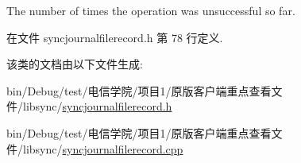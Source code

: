 The number of times the operation was unsuccessful so far. 



在文件 syncjournalfilerecord.\+h 第 78 行定义.



该类的文档由以下文件生成\+:\begin{DoxyCompactItemize}
\item 
bin/\+Debug/test/电信学院/项目1/原版客户端重点查看文件/libsync/\hyperlink{syncjournalfilerecord_8h}{syncjournalfilerecord.\+h}\item 
bin/\+Debug/test/电信学院/项目1/原版客户端重点查看文件/libsync/\hyperlink{syncjournalfilerecord_8cpp}{syncjournalfilerecord.\+cpp}\end{DoxyCompactItemize}
